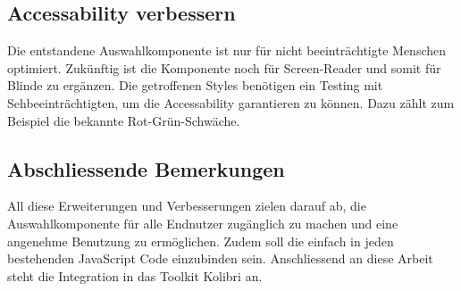 \subsection{Accessability verbessern}
\label{sec:betterAccessability}

Die entstandene Auswahlkomponente ist nur für nicht beeinträchtigte Menschen optimiert.
Zukünftig ist die Komponente noch für Screen-Reader und somit für Blinde zu ergänzen.
Die getroffenen Styles benötigen ein Testing mit Sehbeeinträchtigten, um die Accessability garantieren zu können.
Dazu zählt zum Beispiel die bekannte Rot-Grün-Schwäche.


\subsection{Abschliessende Bemerkungen}
\label{sec:endSumup}

All diese Erweiterungen und Verbesserungen zielen darauf ab, die Auswahlkomponente für alle Endnutzer zugänglich zu machen und eine angenehme Benutzung zu ermöglichen.
Zudem soll die  einfach in jeden bestehenden JavaScript Code einzubinden sein. 
Anschliessend an diese Arbeit steht die Integration in das Toolkit Kolibri an.
